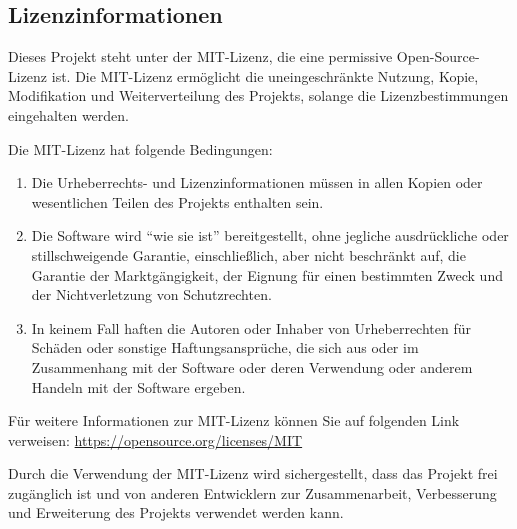 \documentclass[a4paper]{article}
\begin{document}
\clearpage

\subsection{Lizenzinformationen}
Dieses Projekt steht unter der MIT-Lizenz, die eine permissive Open-Source-Lizenz ist. Die MIT-Lizenz ermöglicht die uneingeschränkte Nutzung, Kopie, Modifikation und Weiterverteilung des Projekts, solange die Lizenzbestimmungen eingehalten werden.

Die MIT-Lizenz hat folgende Bedingungen:

\begin{enumerate}
	\item Die Urheberrechts- und Lizenzinformationen müssen in allen Kopien oder wesentlichen Teilen des Projekts enthalten sein.
	\item Die Software wird ``wie sie ist'' bereitgestellt, ohne jegliche ausdrückliche oder stillschweigende Garantie, einschließlich, aber nicht beschränkt auf, die Garantie der Marktgängigkeit, der Eignung für einen bestimmten Zweck und der Nichtverletzung von Schutzrechten.
	\item In keinem Fall haften die Autoren oder Inhaber von Urheberrechten für Schäden oder sonstige Haftungsansprüche, die sich aus oder im Zusammenhang mit der Software oder deren Verwendung oder anderem Handeln mit der Software ergeben.
\end{enumerate}

Für weitere Informationen zur MIT-Lizenz können Sie auf folgenden Link verweisen: \url{https://opensource.org/licenses/MIT}

Durch die Verwendung der MIT-Lizenz wird sichergestellt, dass das Projekt frei zugänglich ist und von anderen Entwicklern zur Zusammenarbeit, Verbesserung und Erweiterung des Projekts verwendet werden kann.

\newpage

\listoffigures
\end{document}
